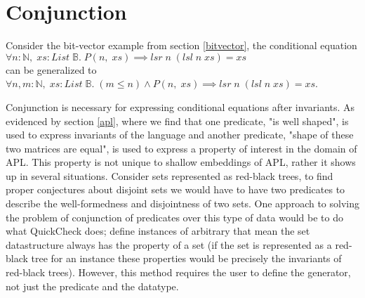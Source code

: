 \section{Conjunction}\label{conjunction}
Consider the bit-vector example from section
\ref{bitvector}, the conditional equation
\\$\forall n:\mathbb{N},\;xs:List\;\mathbb{B}.\;P(n,\;xs)\implies lsr\;n\;(lsl\;n\;xs)=xs$\\
can be generalized to
\\$\forall n,m:\mathbb{N},\;xs:List\;\mathbb{B}.\;(m\leq n)\wedge P(n,\;xs)\implies lsr\;n\;(lsl\;n\;xs)=xs$.

Conjunction is necessary for expressing conditional equations after invariants.
As evidenced by section \ref{apl}, where we find that one predicate, "is well shaped",
is used to express invariants of the language and another predicate, "shape of these two matrices
are equal", is used to express a property of interest in the domain of APL.
This property is not unique to shallow embeddings of APL, rather it shows up in several situations.
Consider sets represented as red-black trees, to find proper conjectures about
disjoint sets we would have to have two predicates to describe the well-formedness
and disjointness of two sets. One approach to solving the problem of conjunction of predicates over this
type of data would be to do what QuickCheck does\cite{Claessen2000}; define instances
of arbitrary that mean the set datastructure always has the property of a set (if the set is represented
as a red-black tree for an instance these properties would be precisely the invariants of red-black trees). 
However, this method requires the user to define the generator, not just the predicate and the datatype.


